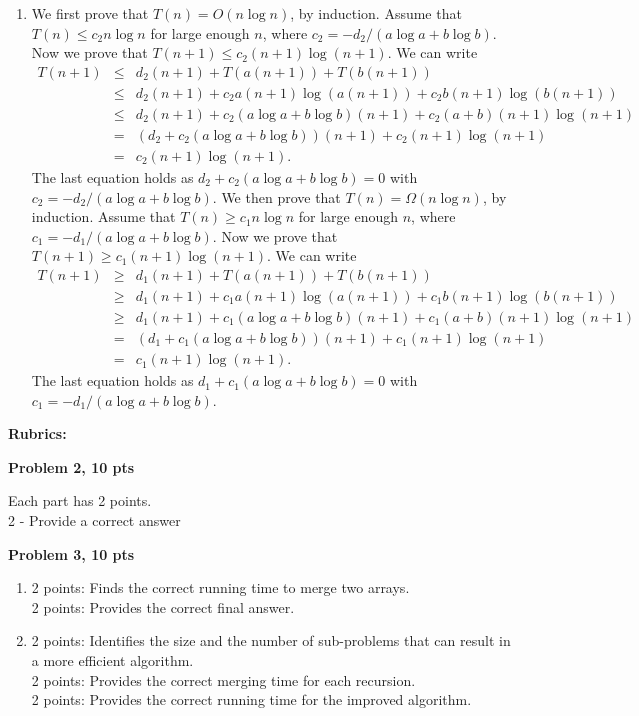 \documentclass[11pt]{article}
\begin{document}
\begin{qunlist}
\begin{enumerate}
\item
We first prove that $T(n) = O(n\log n)$, by induction.
Assume that $T(n) \le c_2n\log n$ for large enough $n$, where $c_2 = -d_2 / (a\log a + b\log b)$.
Now we prove that $T(n + 1) \le c_2(n+1)\log (n+1)$.
We can write
\begin{eqnarray*}
T(n + 1)  & \le & d_2(n+1) + T(a(n+1)) + T(b(n+1)) \\
          & \le & d_2(n+1) + c_2a(n+1)\log (a(n+1)) + c_2b(n+1) \log (b(n+1))\\
          & \le & d_2(n+1) + c_2(a\log a + b\log b)(n+1) + c_2(a+b)(n+1)\log (n+1)\\
          & = & (d_2 + c_2(a\log a + b\log b))(n+1) + c_2(n+1)\log (n+1)\\
		  & =   & c_2(n+1)\log (n+1).
\end{eqnarray*}
The last equation holds as $d_2 + c_2(a\log a+b\log b) = 0$ with $c_2 = -d_2 / (a\log a + b\log b)$.
We then prove that $T(n) = \Omega(n\log n)$, by induction.
Assume that $T(n) \ge c_1n\log n$ for large enough $n$, where $c_1 = -d_1 / (a\log a + b\log b)$.
Now we prove that $T(n + 1) \ge c_1(n+1)\log (n+1)$.
We can write
\begin{eqnarray*}
T(n + 1)  & \ge & d_1(n+1) + T(a(n+1)) + T(b(n+1)) \\
          & \ge & d_1(n+1) + c_1a(n+1)\log (a(n+1)) + c_1b(n+1) \log (b(n+1))\\
          & \ge & d_1(n+1) + c_1(a\log a + b\log b)(n+1) + c_1(a+b)(n+1)\log (n+1)\\
          & = & (d_1 + c_1(a\log a + b\log b))(n+1) + c_1(n+1)\log (n+1)\\
		  & =   & c_1(n+1)\log (n+1).
\end{eqnarray*}
The last equation holds as $d_1 + c_1(a\log a+b\log b) = 0$ with $c_1 = -d_1 / (a\log a + b\log b)$.
\end{enumerate}

\newpage
{\huge {\bf Rubrics:}}

\bigskip

{\bf Problem 2, 10 pts}

Each part has 2 points.\\
2 - Provide a correct answer

{\bf Problem 3, 10 pts}
\begin{enumerate}
\item 2 points: Finds the correct running time to merge two arrays.\\
2 points: Provides the correct final answer.
\item 2 points: Identifies the size and the number of sub-problems that can result in a more efficient algorithm.\\
2 points: Provides the correct merging time for each recursion.\\
2 points: Provides the correct running time for the improved algorithm.
\end{enumerate}


\end{qunlist}
\end{document}
